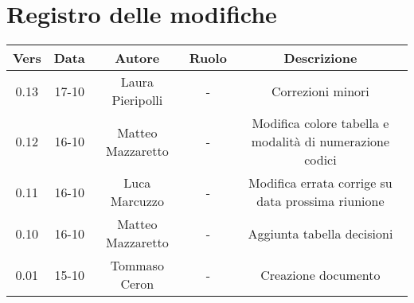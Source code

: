 \section{Registro delle modifiche}

\begin{table}[htbp]
	\begin{tabular}{|c|c|c|c|c|}
		\hline
		\rowcolor[gray]{0.9}
		Vers & Data & Autore & Ruolo & Descrizione \\
		\hline
		0.13 & 17-10 & Laura Pieripolli & - & Correzioni minori \\ 
		\hline
		0.12 & 16-10 & Matteo Mazzaretto & - & Modifica colore tabella e modalità di numerazione codici\\
		\hline
		0.11 & 16-10 & Luca Marcuzzo & - & Modifica errata corrige su data prossima riunione \\
		\hline
		0.10 & 16-10 & Matteo Mazzaretto & - & Aggiunta tabella decisioni \\
		\hline
		0.01 & 15-10 & Tommaso Ceron & - & Creazione documento \\
		\hline
	\end{tabular}
\end{table}